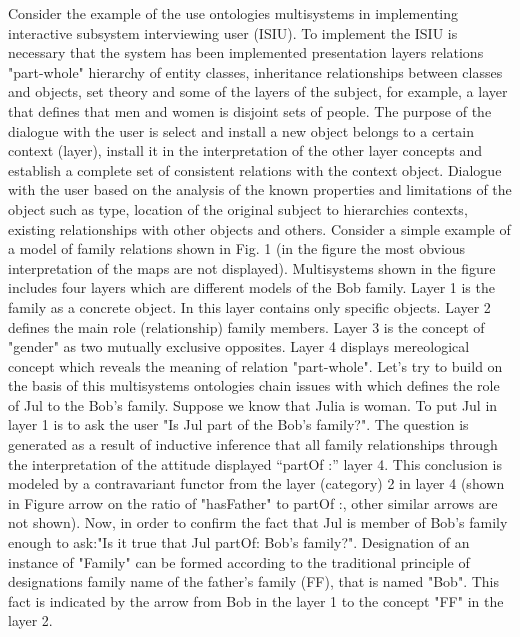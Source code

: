 \documentclass[conference]{IEEEtran}
\begin{document}
Consider the example of the use ontologies multisystems in implementing interactive subsystem interviewing user (ISIU).
	To implement the ISIU is necessary that the system has been implemented presentation layers relations "part-whole" hierarchy of entity classes, inheritance relationships between classes and objects, set theory and some of the layers of the subject, for example, a layer that defines that men and women is disjoint sets of people. The purpose of the dialogue with the user is select and install a new object belongs to a certain context (layer), install it in the interpretation of the other layer concepts  and establish a complete set of consistent relations with the context object. Dialogue with the user based on the analysis of the known properties and limitations of the object such as type, location of the original subject to hierarchies contexts, existing relationships with other objects and others.
	Consider a simple example of a model of family relations shown in Fig. 1 (in the figure the most obvious interpretation of the maps are not displayed). Multisystems shown in the figure  includes four layers which are different models of the Bob family. Layer 1 is the family as a concrete object. In this layer contains only specific objects. Layer 2 defines the main role (relationship) family members. Layer 3 is the concept of "gender" as two mutually exclusive opposites. Layer 4 displays mereological concept which reveals the meaning of relation "part-whole".
	Let's try to build on the basis of this multisystems ontologies chain issues with which defines the role of Jul to the Bob's family. Suppose we know that Julia is woman. To put Jul in layer 1 is to ask the user "Is Jul part of the Bob's family?". The question is generated as a result of inductive inference that all family relationships through the interpretation of the attitude displayed “partOf :” layer 4. This conclusion is modeled by a contravariant functor from the layer (category) 2 in layer 4 (shown in Figure arrow on the ratio of "hasFather" to partOf :, other similar arrows are not shown). Now, in order to confirm the fact that Jul is member of Bob's family enough to ask:"Is it true that Jul partOf: Bob's family?". Designation of an instance of "Family" can be formed according to the traditional principle of designations family name of the father's family (FF), that is named "Bob". This fact is indicated by the arrow from Bob in the layer 1 to the concept "FF" in the layer 2.
\end{document}
